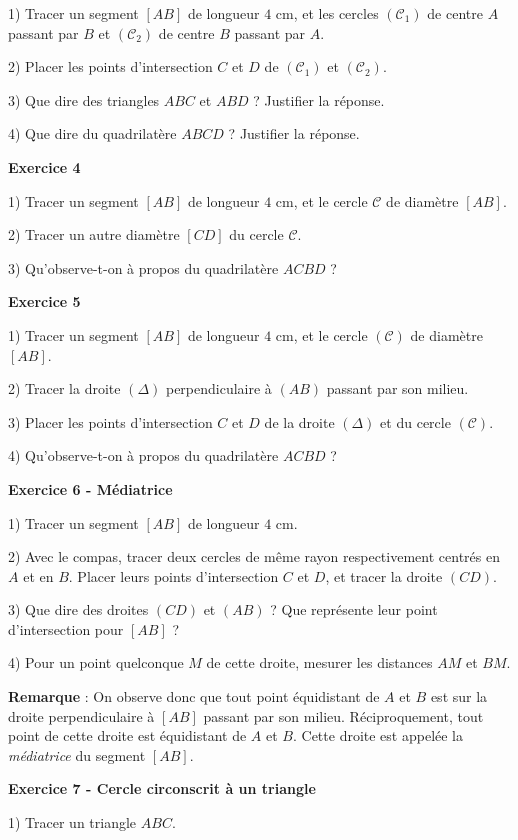 \documentclass[12 pt]{article}
\theoremstyle{plain}
\newcounter{n}
\numberwithin{n}{section}
\begin{document}
1) Tracer un segment $[AB]$ de longueur $4$ cm, et les cercles $(\mathcal C_1)$ de centre $A$ passant par $B$ 
et $(\mathcal C_2)$ de centre $B$ passant par $A$. 

2) Placer les points d'intersection $C$ et $D$ de $(\mathcal C_1)$ et $(\mathcal C_2)$. 

3) Que dire des triangles $ABC$ et $ABD$ ? Justifier la réponse. 

4) Que dire du quadrilatère $ABCD$ ? Justifier la réponse. 

\textbf{Exercice 4}

1) Tracer un segment $[AB]$ de longueur $4$ cm, et le cercle $\mathcal C$ de diamètre $[AB]$. 

2) Tracer un autre diamètre $[CD]$ du cercle $\mathcal C$. 

3) Qu'observe-t-on à propos du quadrilatère $ACBD$ ? 

\textbf{Exercice 5}

1) Tracer un segment $[AB]$ de longueur $4$ cm, et le cercle $(\mathcal C)$ de diamètre $[AB]$. 

2) Tracer la droite $(\Delta)$ perpendiculaire à $(AB)$ passant par son milieu. 

3) Placer les points d'intersection $C$ et $D$ de la droite $(\Delta)$ et du cercle $(\mathcal C)$.

4) Qu'observe-t-on à propos du quadrilatère $ACBD$ ? 


\textbf{Exercice 6 - Médiatrice}

1) Tracer un segment $[AB]$ de longueur $4$ cm. 

2) Avec le compas, tracer deux cercles de même rayon respectivement centrés en $A$ et en $B$. 
Placer leurs points d'intersection $C$ et $D$, et tracer la droite $(CD)$. 

3) Que dire des droites $(CD)$ et $(AB)$ ? Que représente leur point d'intersection pour $[AB]$ ?

4) Pour un point quelconque $M$ de cette droite, mesurer les distances $AM$ et $BM$. 

\textbf{Remarque} : On observe donc que tout point équidistant de $A$ et $B$ est sur la droite perpendiculaire à
$[AB]$ passant par son milieu. Réciproquement, tout point de cette droite est équidistant de $A$ et $B$. 
Cette droite est appelée la \emph{médiatrice} du segment $[AB]$. 

\textbf{Exercice 7 - Cercle circonscrit à un triangle}

1) Tracer un triangle $ABC$. 
\end{document}
